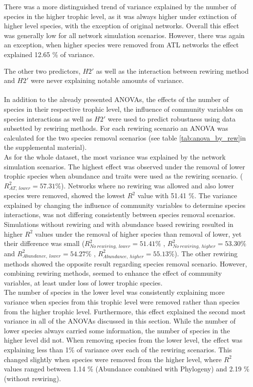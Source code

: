 \documentclass[12pt,a4paper]{article}
\begin{document}
There was a more distinguished trend of variance explained by the number of species in the higher trophic level, as it was always higher under extinction of higher level species, with the exception of original networks. Overall this effect was generally low for all network simulation scenarios. However, there was again an exception, when higher species were removed from ATL networks the effect explained 12.65 \% of variance. 

The other two predictors, $H2'$ as well as the interaction between rewiring method and $H2'$ were never explaining notable amounts of variance. \paragraph{}

In addition to the already presented ANOVAs, the effects of the number of species in their respective trophic level, the influence of community variables on species interactions as well as $H2'$ were used to predict robustness using data subsetted by rewiring methods. For each rewiring scenario an ANOVA was calculated for the two species removal scenarios (see table \ref{tab:anova_by_rew}in the supplemental material). \\

As for the whole dataset, the most variance was explained by the network simulation scenarios. The highest effect was observed under the removal of lower trophic species when abundance and traits were used as the rewiring scenario. ($R^2_{AT,\: lower} = 57.31 \%$). Networks where no rewiring was allowed and also lower species were removed, showed the lowest $R^2$ value with 51.41 \%. The variance explained by changing the influence of community variables to determine species interactions, was not differing consistently between species removal scenarios. Simulations without rewiring and with abundance based rewiring resulted in higher $R^2$ values under the removal of higher species than removal of lower, yet their difference was small ($R^2_{No \: rewiring,\: lower} = 51.41\%$ , $R^2_{No \: rewiring,\: higher} = 53.30\%$ and $R^2_{Abundance,\: lower} = 54.27\%$ , $R^2_{Abundance,\: higher} = 55.13\%$). The other rewiring methods showed the opposite result regarding species removal scenario. However, combining rewiring methods, seemed to enhance the effect of community variables, at least under loss of lower trophic species. \\

The number of species in the lower level was consistently explaining more variance when species from this trophic level were removed rather than species from the higher trophic level. Furthermore, this effect explained the second most variance in all of the ANOVAs discussed in this section. While the number of lower species always carried some information, the number of species in the higher level did not. When removing species from the lower level, the effect was explaining less than 1\% of variance over each of the rewiring scenarios. This changed slightly when species were removed from the higher level, where $R^2$ values ranged between 1.14 \% (Abundance combined with Phylogeny) and 2.19 \% (without rewiring).\\
\end{document}
